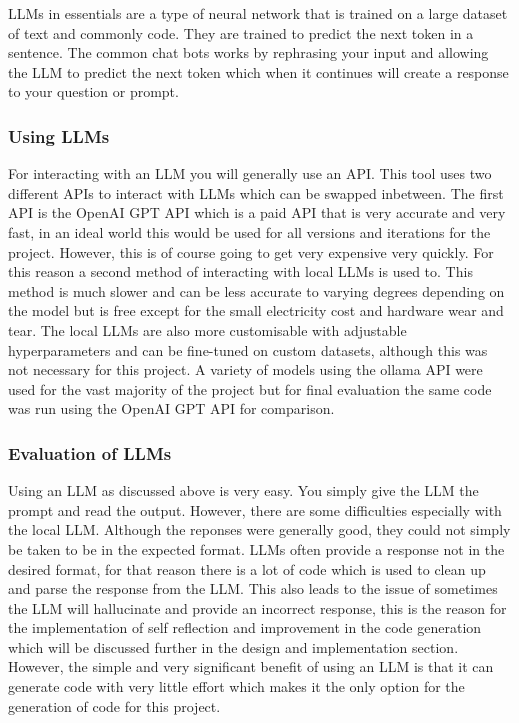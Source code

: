 \documentclass[12pt]{extarticle}
\begin{document}
LLMs in essentials are a type of neural network that is trained on a large dataset of text and commonly code. They are trained to predict the next token in a sentence. The common chat bots works by rephrasing your input and allowing the LLM to predict the next token which when it continues will create a response to your question or prompt.

\subsubsection{Using LLMs}

For interacting with an LLM you will generally use an API. This tool uses two different APIs to interact with LLMs which can be swapped inbetween. The first API is the OpenAI GPT API which is a paid API that is very accurate and very fast, in an ideal world this would be used for all versions and iterations for the project. However, this is of course going to get very expensive very quickly. For this reason a second method of interacting with local LLMs is used to. This method is much slower and can be less accurate to varying degrees depending on the model but is free except for the small electricity cost and hardware wear and tear. The local LLMs are also more customisable with adjustable hyperparameters and can be fine-tuned on custom datasets, although this was not necessary for this project. A variety of models using the ollama API were used for the vast majority of the project but for final evaluation the same code was run using the OpenAI GPT API for comparison.

\subsubsection{Evaluation of LLMs}

Using an LLM as discussed above is very easy. You simply give the LLM the prompt and read the output. However, there are some difficulties especially with the local LLM. Although the reponses were generally good, they could not simply be taken to be in the expected format. LLMs often provide a response not in the desired format, for that reason there is a lot of code which is used to clean up and parse the response from the LLM. This also leads to the issue of sometimes the LLM will hallucinate and provide an incorrect response, this is the reason for the implementation of self reflection and improvement in the code generation which will be discussed further in the design and implementation section. However, the simple and very significant benefit of using an LLM is that it can generate code with very little effort which makes it the only option for the generation of code for this project.
\end{document}

